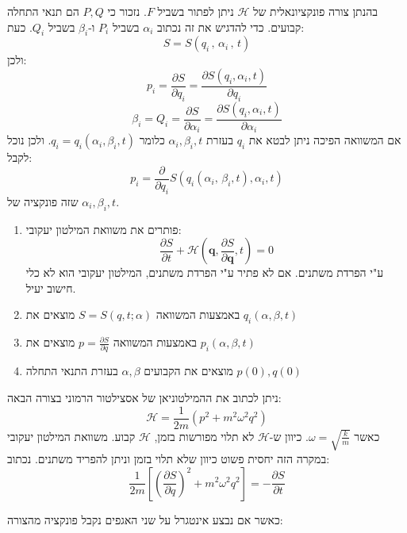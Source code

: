 \documentclass{tstextbook}
\begin{document}
בהנתן צורה פונקציונאלית של \(\mathcal{H}\) ניתן לפתור בשביל \(F\). נזכור כי \(P,Q\) הם תנאי התחלה קבועים. כדי להדגיש את זה נכתוב \(\alpha_{i}\) בשביל \(P_{i}\) ו-\(\beta_{i}\) בשביל \(Q_{i}\). כעת:
$$S=S(q_{i}\,,\,\alpha_{i}\,,\,t)$$
ולכן:
$$p_{i}=\frac{\partial S}{\partial q_{i}}=\frac{\partial S(q_{i},\alpha_{i},t)}{\partial q_{i}}$$$$\beta_{i}=Q_{i}=\frac{\partial S}{\partial\alpha_{i}}=\frac{\partial S(q_{i},\alpha_{i},t)}{\partial\alpha_{i}}$$
אם המשוואה הפיכה ניתן לבטא את \(q_{i}\) בעזרת \(\alpha_{i},\beta_{i},t\)  כלומר \(q_{i}=q_{i}\left( \alpha_{i},\beta_{i},t \right)\). ולכן נוכל לקבל:
$$p_{i}=\frac{\partial}{\partial q_{i}}S(q_{i}(\alpha_{i},\,\beta_{i},t),\alpha_{i},t)$$
שזה פונקציה של \(\alpha_{i},\beta_{i},t\). 

\begin{proposition}
  \begin{enumerate}
    \item פותרים את משוואת המילטון יעקובי: 
$${\frac{\partial S}{\partial t}}+{\mathcal{H}}\left({\mathbf{q}},{\frac{\partial S}{\partial{\mathbf{q}}}},t\right)=0$$
ע"י הפרדת משתנים. אם לא פתיר ע"י הפרדת משתנים, המילטון יעקובי הוא לא כלי חישוב יעיל.


    \item באמצעות המשוואה \(S=S\left( q,t;\alpha \right)\) מוצאים את \(q_{i}\left( \alpha,\beta,t \right)\)


    \item באמצעות המשוואה \(p=\frac{\partial S}{\partial q}\) מוצאים את \(p_{i}\left( \alpha,\beta,t \right)\)


    \item מוצאים את הקבועים \(\alpha,\beta\) בעזרת התנאי התחלה \(p(0),q(0)\)


  \end{enumerate}
\end{proposition}
\begin{example}
ניתן לכתוב את ההמילטוניאן של אסצילטור הרמוני בצורה הבאה:
$$\mathcal{H}=\frac{1}{2m}\left(p^{2}+m^{2}\omega^{2}q^{2}\right)$$
כאשר \(\omega=\sqrt{ \frac{k}{m} }\). כיוון ש-\(\mathcal{H}\) לא תלוי מפורשות בזמן, \(\mathcal{H}\) קבוע. משוואת המילטון יעקובי במקרה הזה יחסית פשוט כיוון שלא תלוי בזמן וניתן להפריד משתנים.  נכתוב:
$$\frac{1}{2m}\left[\left(\frac{\partial S}{\partial q}\right)^{2}+m^{2}\omega^{2}q^{2}\right]=-\frac{\partial S}{\partial t}$$

\end{example}
כאשר אם נבצע אינטגרל על שני האגפים נקבל פונקציה מהצורה:
\end{document}
